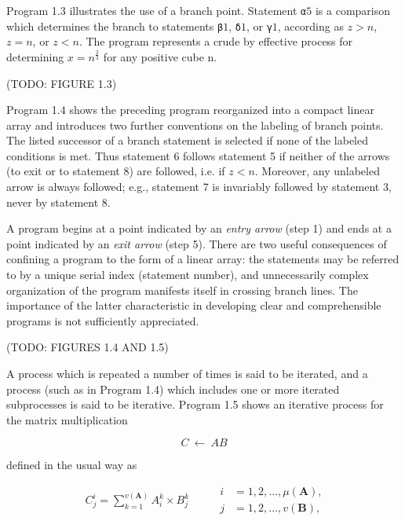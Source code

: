 \par Program 1.3 illustrates the use of a branch point. Statement \verb|α|$5$ is a comparison which determines the branch to statements \verb|β|$1$, \verb|δ|$1$, or \verb|γ|$1$, according as $z > n$, $z = n$, or $z < n$. The program represents a crude by effective process for determining $x = n^\frac{2}{3}$ for any positive cube n.

\par (TODO: FIGURE 1.3)

\par Program 1.4 shows the preceding program reorganized into a compact linear array and introduces two further conventions on the labeling of branch points. The listed successor of a branch statement is selected if none of the labeled conditions is met. Thus statement 6 follows statement 5 if neither of the arrows (to exit or to statement 8) are followed, i.e. if $z < n$. Moreover, any unlabeled arrow is always followed; e.g., statement 7 is invariably followed by statement 3, never by statement 8.

\par A program begins at a point indicated by an \textit{entry arrow} (step 1) and ends at a point indicated by an \textit{exit arrow} (step 5). There are two useful consequences of confining a program to the form of a linear array: the statements may be referred to by a unique serial index (statement number), and unnecessarily complex organization of the program manifests itself in crossing branch lines. The importance of the latter characteristic in developing clear and comprehensible programs is not sufficiently appreciated.

\par (TODO: FIGURES 1.4 AND 1.5)

\par A process which is repeated a number of times is said to be iterated, and a process (such as in Program 1.4) which includes one or more iterated subprocesses is said to be iterative. Program 1.5 shows an iterative process for the matrix multiplication

$$
      C\ ←\ AB
$$

\noindent defined in the usual way as

\begin{equation*}
  \begin{split}
    C^i_j = \sum^{v(\textbf{A})}_{k=1} A^k_i \times B^k_j
  \end{split}
\quad\quad
  \begin{split}
    i &= 1,2, ..., \mu(\textbf{A}),\\
    j &= 1,2, ..., v(\textbf{B}),
  \end{split}
\end{equation*}

